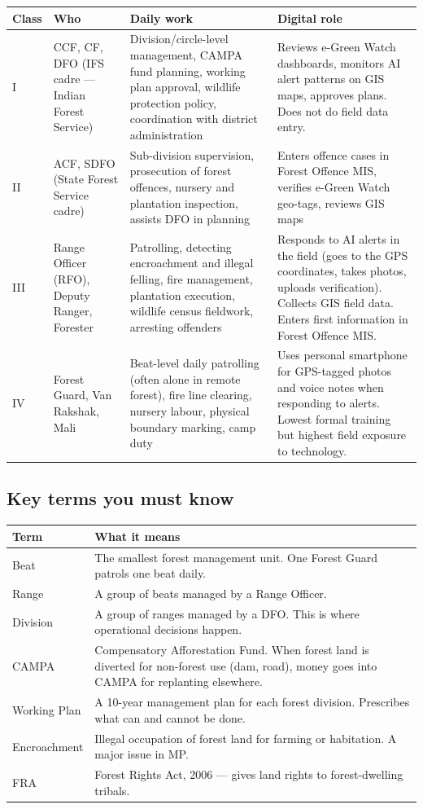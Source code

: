 \documentclass[11pt,a4paper]{article}
\begin{document}
\begin{tabularx}{\textwidth}{@{}L{1cm} L{3cm} L{4.8cm} X@{}}
\toprule
\textbf{Class} & \textbf{Who} & \textbf{Daily work} & \textbf{Digital role} \\
\midrule
I & CCF, CF, DFO (IFS cadre --- Indian Forest Service) & Division/circle-level management, CAMPA fund planning, working plan approval, wildlife protection policy, coordination with district administration & Reviews e-Green Watch dashboards, monitors AI alert patterns on GIS maps, approves plans. Does not do field data entry. \\[6pt]
II & ACF, SDFO (State Forest Service cadre) & Sub-division supervision, prosecution of forest offences, nursery and plantation inspection, assists DFO in planning & Enters offence cases in Forest Offence MIS, verifies e-Green Watch geo-tags, reviews GIS maps \\[6pt]
III & Range Officer (RFO), Deputy Ranger, Forester & Patrolling, detecting encroachment and illegal felling, fire management, plantation execution, wildlife census fieldwork, arresting offenders & Responds to AI alerts in the field (goes to the GPS coordinates, takes photos, uploads verification). Collects GIS field data. Enters first information in Forest Offence MIS. \\[6pt]
IV & Forest Guard, Van Rakshak, Mali & Beat-level daily patrolling (often alone in remote forest), fire line clearing, nursery labour, physical boundary marking, camp duty & Uses personal smartphone for GPS-tagged photos and voice notes when responding to alerts. Lowest formal training but highest field exposure to technology. \\
\bottomrule
\end{tabularx}

\subsection{Key terms you must know}

\begin{tabularx}{\textwidth}{@{}L{3cm} X@{}}
\toprule
\textbf{Term} & \textbf{What it means} \\
\midrule
Beat & The smallest forest management unit. One Forest Guard patrols one beat daily. \\
Range & A group of beats managed by a Range Officer. \\
Division & A group of ranges managed by a DFO. This is where operational decisions happen. \\
CAMPA & Compensatory Afforestation Fund. When forest land is diverted for non-forest use (dam, road), money goes into CAMPA for replanting elsewhere. \\
Working Plan & A 10-year management plan for each forest division. Prescribes what can and cannot be done. \\
Encroachment & Illegal occupation of forest land for farming or habitation. A major issue in MP. \\
FRA & Forest Rights Act, 2006 --- gives land rights to forest-dwelling tribals. \\
\bottomrule
\end{tabularx}
\end{document}
